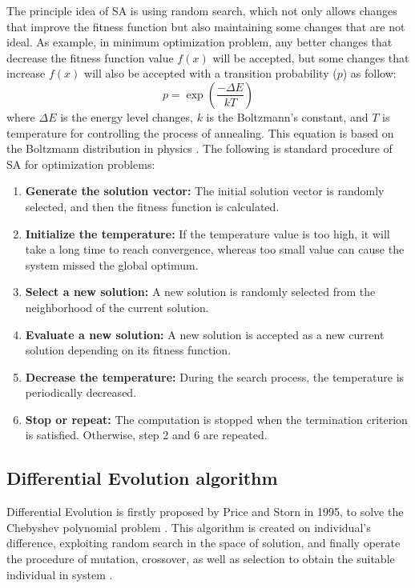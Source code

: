\documentclass[10pt,letterpaper]{article}
\begin{document}
The principle idea of SA is using random search, which not only allows changes that improve the fitness function but also maintaining some changes that are not ideal. As example, in minimum optimization problem, any better changes that decrease the fitness function value $f(x)$ will be accepted, but some changes that increase $f(x)$ will also be accepted with a transition probability ($p$) as follow:
\begin{equation}
    p=\exp({\frac{-\Delta E}{kT}})
\end{equation}
where \( \Delta E\) is the energy level changes, $k$ is the Boltzmann's constant, and $T$ is temperature for controlling the process of annealing. This equation is based on the Boltzmann distribution in physics \cite{Yang}. The following is standard procedure of SA for optimization problems: 
\begin{enumerate}
    \item \textbf{Generate the solution vector:} The initial solution vector is randomly selected, and then the fitness function is calculated.
    \item \textbf{Initialize the temperature:} If the temperature value is too high, it will take a long time to reach convergence, whereas too small value can cause the system missed the global optimum.
    \item \textbf{Select a new solution:} A new solution is randomly selected from the neighborhood of the current solution.
    \item \textbf{Evaluate a new solution:} A new solution is accepted as a new current solution depending on its fitness function.
    \item \textbf{Decrease the temperature:} During the search process, the temperature is periodically decreased.
    \item \textbf{Stop or repeat:} The computation is stopped when the termination criterion is satisfied. Otherwise, step 2 and 6 are repeated.
\end{enumerate}


\subsection{Differential Evolution algorithm}
Differential Evolution is firstly proposed by Price and Storn in 1995, to solve the Chebyshev polynomial problem \cite{Boussaid}. This algorithm is created on individual’s difference, exploiting random search in the space of solution, and finally operate the procedure of mutation, crossover, as well as selection to obtain the suitable individual in system \cite{Noman}. 
\end{document}
